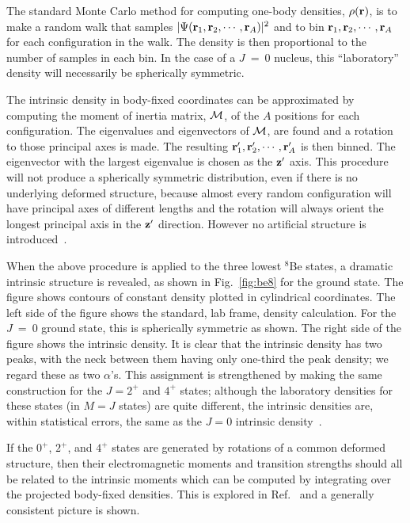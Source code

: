The standard Monte Carlo method for computing one-body densities, 
$\rho({\bf r})$, is to make a random walk that samples 
$|\Psi({\bf r}_1,{\bf r}_2,\cdots,{\bf r}_A)|^2$ and 
to bin ${\bf r}_1,{\bf r}_2,\cdots,{\bf r}_A$ 
for each configuration
in the walk.  The density is then proportional to the number
of samples in each bin.  In the case of a $J$~=~0 nucleus, this
``laboratory'' density will necessarily be spherically symmetric.

The intrinsic density in body-fixed coordinates can be approximated 
by computing the moment of inertia matrix, ${\cal M}$, of the $A$ positions
for each configuration.
The eigenvalues and eigenvectors of ${\cal M}$, are found and a
rotation to those principal axes is made.  The resulting 
${\bf r}_1^\prime,{\bf r}_2^\prime,\cdots,{\bf r}_A^\prime$ is then binned.
The eigenvector with the largest eigenvalue is chosen as the
${\bf z}^\prime$ axis.
This procedure will not produce a spherically symmetric distribution,
even if there is no underlying deformed structure, because 
almost every random configuration will have  principal axes of different
lengths and the rotation will always orient the longest principal axis
in the ${\bf z}^\prime$ direction.  However no 
artificial structure is introduced~\cite{WPCP00}.

When the above procedure is applied to the three lowest $^8$Be states,
a dramatic intrinsic structure is revealed, as shown in Fig.~\ref{fig:be8}
for the ground state.  
The figure shows contours of constant density plotted in cylindrical 
coordinates.
The left side of the figure shows the standard, lab frame, density 
calculation.
For the $J$~=~0 ground state, this is spherically symmetric as shown.
The right side of the figure shows the intrinsic density.
It is clear that the intrinsic density has two peaks, with the neck
between them having only one-third the peak density; we regard these
as two $\alpha$'s.  This assignment is strengthened by making
the same construction for the $J=2^+$ and $4^+$ states; although
the laboratory densities for these states (in $M=J$ states) are
quite different, the intrinsic densities are, within statistical errors,
the same as the $J=0$ intrinsic density~\cite{WPCP00}.

If the $0^+$, $2^+$, and $4^+$ states are generated by rotations
of a common deformed structure, then their electromagnetic moments
and transition strengths should all be related to the intrinsic
moments which can be computed by integrating over the
projected body-fixed densities.  This is explored in Ref.~\cite{WPCP00}
and a generally consistent picture is shown.

